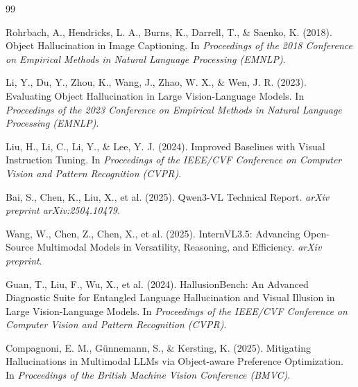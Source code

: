 \documentclass[11pt,a4paper]{article}
\begin{document}
\begin{thebibliography}{99}

Rohrbach, A., Hendricks, L. A., Burns, K., Darrell, T., \& Saenko, K. (2018). Object Hallucination in Image Captioning. In \textit{Proceedings of the 2018 Conference on Empirical Methods in Natural Language Processing (EMNLP)}.

Li, Y., Du, Y., Zhou, K., Wang, J., Zhao, W. X., \& Wen, J. R. (2023). Evaluating Object Hallucination in Large Vision-Language Models. In \textit{Proceedings of the 2023 Conference on Empirical Methods in Natural Language Processing (EMNLP)}.

Liu, H., Li, C., Li, Y., \& Lee, Y. J. (2024). Improved Baselines with Visual Instruction Tuning. In \textit{Proceedings of the IEEE/CVF Conference on Computer Vision and Pattern Recognition (CVPR)}.

Bai, S., Chen, K., Liu, X., et al. (2025). Qwen3-VL Technical Report. \textit{arXiv preprint arXiv:2504.10479}.

Wang, W., Chen, Z., Chen, X., et al. (2025). InternVL3.5: Advancing Open-Source Multimodal Models in Versatility, Reasoning, and Efficiency. \textit{arXiv preprint}.

Guan, T., Liu, F., Wu, X., et al. (2024). HallusionBench: An Advanced Diagnostic Suite for Entangled Language Hallucination and Visual Illusion in Large Vision-Language Models. In \textit{Proceedings of the IEEE/CVF Conference on Computer Vision and Pattern Recognition (CVPR)}.

Compagnoni, E. M., Günnemann, S., \& Kersting, K. (2025). Mitigating Hallucinations in Multimodal LLMs via Object-aware Preference Optimization. In \textit{Proceedings of the British Machine Vision Conference (BMVC)}.

\end{thebibliography}
\end{document}

